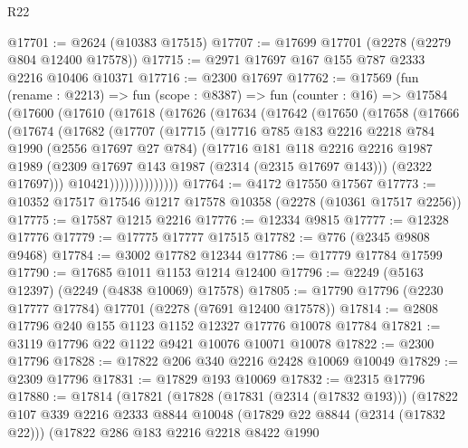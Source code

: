 \begin{lexlean}{R22}
\begin{coremodule}
@17701 := @2624 (@10383 @17515)
@17707 := @17699 @17701 (@2278 (@2279 @804 @12400 @17578))
@17715 := @2971 @17697 @167 @155 @787 @2333 @2216 @10406 @10371
@17716 := @2300 @17697
@17762 := @17569
    (fun (rename : @2213) =>
    fun (scope : @8387) =>
    fun (counter : @16) =>
    @17584
      (@17600
        (@17610
          (@17618
            (@17626
              (@17634
                (@17642
                  (@17650
                    (@17658
                      (@17666
                        (@17674
                          (@17682
                            (@17707
                              (@17715
                                (@17716
                                  @785
                                  @183
                                  @2216
                                  @2218
                                  @784
                                  @1990
                                  (@2556 @17697 @27 @784)
                                  (@17716
                                    @181
                                    @118
                                    @2216
                                    @2216
                                    @1987
                                    @1989
                                    (@2309 @17697 @143 @1987 (@2314 (@2315 @17697 @143)))
                                    (@2322 @17697)))
                                @10421))))))))))))))
@17764 := @4172 @17550 @17567
@17773 := @10352 @17517 @17546 @1217 @17578 @10358 (@2278 (@10361 @17517 @2256))
@17775 := @17587 @1215 @2216
@17776 := @12334 @9815
@17777 := @12328 @17776
@17779 := @17775 @17777 @17515
@17782 := @776 (@2345 @9808 @9468)
@17784 := @3002 @17782 @12344
@17786 := @17779 @17784 @17599
@17790 := @17685 @1011 @1153 @1214 @12400
@17796 := @2249 (@5163 @12397) (@2249 (@4838 @10069) @17578)
@17805 := @17790 @17796 (@2230 @17777 @17784) @17701 (@2278 (@7691 @12400 @17578))
@17814 := @2808 @17796 @240 @155 @1123 @1152 @12327 @17776 @10078 @17784
@17821 := @3119 @17796 @22 @1122 @9421 @10076 @10071 @10078
@17822 := @2300 @17796
@17828 := @17822 @206 @340 @2216 @2428 @10069 @10049
@17829 := @2309 @17796
@17831 := @17829 @193 @10069
@17832 := @2315 @17796
@17880 := @17814
    (@17821
      (@17828
        (@17831 (@2314 (@17832 @193)))
        (@17822
          @107
          @339
          @2216
          @2333
          @8844
          @10048
          (@17829 @22 @8844 (@2314 (@17832 @22)))
          (@17822
            @286
            @183
            @2216
            @2218
            @8422
            @1990

\end{coremodule}
\end{lexlean}
